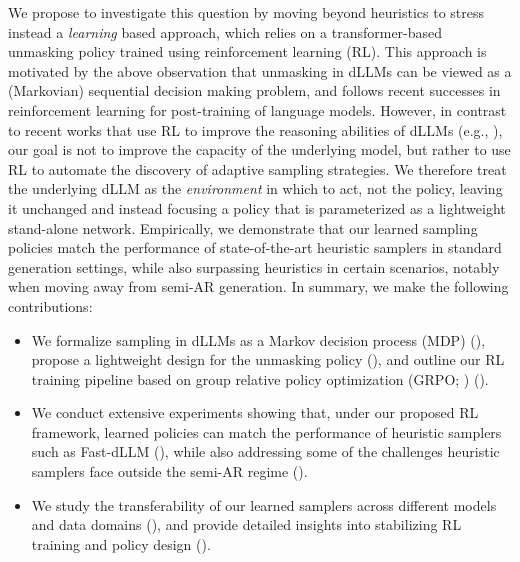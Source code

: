 We propose to investigate this question by moving beyond heuristics to stress instead a \textit{learning} based approach, which relies on a transformer-based unmasking policy trained using reinforcement learning (RL).
This approach is motivated by the above observation that unmasking in dLLMs can be viewed as a (Markovian) sequential decision making problem, and follows recent successes in reinforcement learning for post-training of language models.
However, in contrast to recent works that use RL to improve the reasoning abilities of dLLMs (e.g., \citealt{zhao2025d1}), our goal is not to improve the capacity of the underlying model, but rather to use RL to automate the discovery of adaptive sampling strategies.
We therefore treat the underlying dLLM as the \emph{environment} in which to act, not the policy, leaving it unchanged and instead focusing a policy that is parameterized as a lightweight stand-alone network.
Empirically, we demonstrate that our learned sampling policies match the performance of state-of-the-art heuristic samplers \citep{fastdllm2025} in standard generation settings, while also surpassing heuristics in certain scenarios, notably when moving away from semi-AR generation. %
In summary, we make the following contributions:
\begin{itemize}
\item We formalize sampling in dLLMs as a Markov decision process (MDP) (), propose a lightweight design for the unmasking policy %
(), and outline our RL training pipeline based on group relative policy optimization (GRPO; \citealt{shao2024deepseekmath}) ().
\item We conduct extensive experiments showing that, under our proposed RL framework, learned policies can match the performance of heuristic samplers such as Fast-dLLM (), while also addressing some of the challenges heuristic samplers face outside the semi-AR regime ().
\item We study the transferability of our learned samplers across different models and data domains (), and provide detailed insights into stabilizing RL training and policy design ().
\end{itemize}

